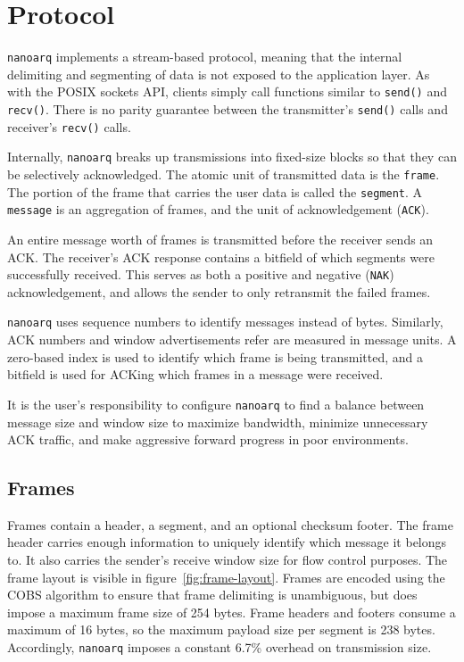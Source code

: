 \documentclass[11pt]{article}
\newcommand{\nanoarq}{\texttt{nanoarq}}
\begin{document}
\section{Protocol}
\nanoarq{} implements a stream-based protocol, meaning that the internal delimiting and segmenting of data is not exposed to the application layer. As with the POSIX sockets API, clients simply call functions similar to \texttt{send()} and \texttt{recv()}. There is no parity guarantee between the transmitter's \texttt{send()} calls and receiver's \texttt{recv()} calls. \par
Internally, \nanoarq{} breaks up transmissions into fixed-size blocks so that they can be selectively acknowledged. The atomic unit of transmitted data is the \texttt{frame}. The portion of the frame that carries the user data is called the \texttt{segment}. A \texttt{message} is an aggregation of frames, and the unit of acknowledgement (\texttt{ACK}). \par

An entire message worth of frames is transmitted before the receiver sends an ACK. The receiver's ACK response contains a bitfield of which segments were successfully received. This serves as both a positive and negative (\texttt{NAK}) acknowledgement, and allows the sender to only retransmit the failed frames. \par

\nanoarq{} uses sequence numbers to identify messages instead of bytes. Similarly, ACK numbers and window advertisements refer are measured in message units. A zero-based index is used to identify which frame is being transmitted, and a bitfield is used for ACKing which frames in a message were received. \par

It is the user's responsibility to configure \nanoarq{} to find a balance between message size and window size to maximize bandwidth, minimize unnecessary ACK traffic, and make aggressive forward progress in poor environments. \par

\subsection{Frames}
Frames contain a header, a segment, and an optional checksum footer. The frame header carries enough information to uniquely identify which message it belongs to. It also carries the sender's receive window size for flow control purposes. The frame layout is visible in figure~\ref{fig:frame-layout}. Frames are encoded using the COBS algorithm to ensure that frame delimiting is unambiguous, but does impose a maximum frame size of 254 bytes. Frame headers and footers consume a maximum of 16 bytes, so the maximum payload size per segment is 238 bytes. Accordingly, \nanoarq{} imposes a constant 6.7\% overhead on transmission size.\par
\end{document}
